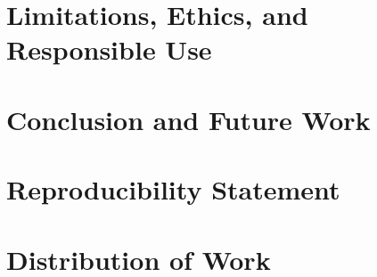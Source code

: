 \documentclass[conference]{IEEEtran}
\begin{document}
\section{Limitations, Ethics, and Responsible Use}

\section{Conclusion and Future Work}

\section*{Reproducibility Statement}

\section*{Distribution of Work}



\end{document}
